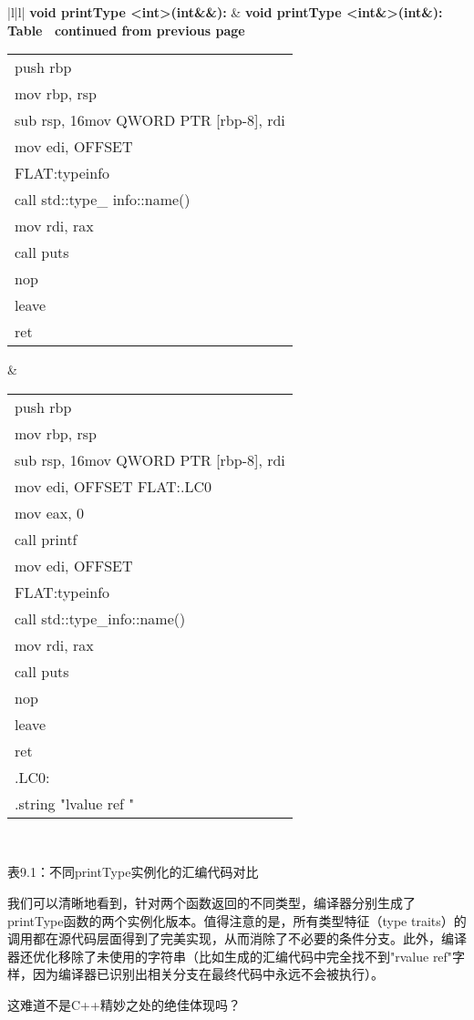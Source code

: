 \begin{longtable}{|l|l|}
\hline
\textbf{void printType \textless{}int\textgreater{}(int\&\&):} &
  \textbf{void printType \textless{}int\&\textgreater{}(int\&):} \\ \hline
\endfirsthead
%
%
{{\bfseries Table \thetable\ continued from previous page}} \\
\endhead
%
\begin{tabular}[c]{@{}l@{}}push rbp\\ mov rbp, rsp\\ sub rsp, 16mov QWORD PTR {[}rbp-8{]}, rdi\\ mov edi, OFFSET \\                   FLAT:typeinfo \\ call std::type\_ info::name() \\ mov rdi, rax\\ call puts \\ nop \\ leave \\ ret\end{tabular} &
  \begin{tabular}[c]{@{}l@{}}push rbp\\ mov rbp, rsp\\ sub rsp, 16mov QWORD PTR {[}rbp-8{]}, rdi\\ mov edi, OFFSET FLAT:.LC0 \\ mov eax, 0 \\ call printf \\ mov edi, OFFSET \\                  FLAT:typeinfo \\ call std::type\_info::name() \\ mov rdi, rax\\ call puts \\ nop \\ leave \\ ret \\   .LC0:\\     .string "lvalue ref "\end{tabular} \\ \hline
\end{longtable}

\begin{center}
表9.1：不同printType实例化的汇编代码对比
\end{center}

我们可以清晰地看到，针对两个函数返回的不同类型，编译器分别生成了printType函数的两个实例化版本。值得注意的是，所有类型特征（type traits）的调用都在源代码层面得到了完美实现，从而消除了不必要的条件分支。此外，编译器还优化移除了未使用的字符串（比如生成的汇编代码中完全找不到"rvalue ref"字样，因为编译器已识别出相关分支在最终代码中永远不会被执行）。

这难道不是C++精妙之处的绝佳体现吗？





















